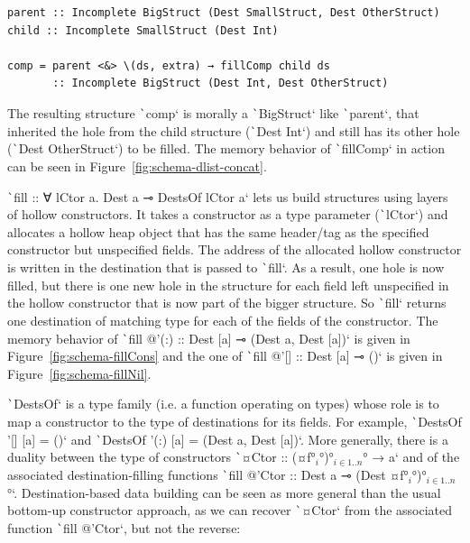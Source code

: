 \documentclass[english]{jflart}
\newlength{\currentparskip}
\newenvironment{unbreakable}
{%
  \setlength{\currentparskip}{\parskip}%
  \setlength{\parskip}{\currentparskip}%
  \par\vspace{0.5\baselineskip}%
  \noindent\begin{minipage}{\textwidth}%
    \setlength{\parskip}{\currentparskip}%
}
{%
  \end{minipage}%
  \par\vspace{0.5\baselineskip}%
}
\begin{document}
\begin{unbreakable}
{\small
\begin{verbatim}
parent :: Incomplete BigStruct (Dest SmallStruct, Dest OtherStruct)
child :: Incomplete SmallStruct (Dest Int)

comp = parent <&> \(ds, extra) → fillComp child ds
       :: Incomplete BigStruct (Dest Int, Dest OtherStruct)
\end{verbatim}
}
\end{unbreakable}

The resulting structure \texttt`comp` is morally a \texttt`BigStruct` like \texttt`parent`, that inherited the hole from the child structure (\texttt`Dest Int`) and still has its other hole (\texttt`Dest OtherStruct`) to be filled. The memory behavior of \texttt`fillComp` in action can be seen in Figure~\ref{fig:schema-dlist-concat}.

\texttt`fill :: ∀ lCtor a. Dest a ⊸ DestsOf lCtor a` lets us build structures using layers of hollow constructors. It takes a constructor as a type parameter (\texttt`lCtor`) and allocates a hollow heap object that has the same header/tag as the specified constructor but unspecified fields. The address of the allocated hollow constructor is written in the destination that is passed to \texttt`fill`. As a result, one hole is now filled, but there is one new hole in the structure for each field left unspecified in the hollow constructor that is now part of the bigger structure. So \texttt`fill` returns one destination of matching type for each of the fields of the constructor. The memory behavior of \texttt`fill @'(:) :: Dest [a] ⊸ (Dest a, Dest [a])` is given in Figure~\ref{fig:schema-fillCons} and the one of \texttt`fill @'[] :: Dest [a] ⊸ ()` is given in Figure~\ref{fig:schema-fillNil}.

\texttt`DestsOf` is a type family (i.e. a function operating on types) whose role is to map a constructor to the type of destinations for its fields. For example, \texttt`DestsOf '[] [a] = ()` and \texttt`DestsOf '(:) [a] = (Dest a, Dest [a])`. More generally, there is a duality between the type of constructors \texttt`¤Ctor :: (¤f°$_i$°)°$_{i \in 1..n}$° → a` and of the associated destination-filling functions \texttt`fill @'Ctor :: Dest a ⊸ (Dest ¤f°$_i$°)°$_{i \in 1..n}$°`. Destination-based data building can be seen as more general than the usual bottom-up constructor approach, as we can recover \texttt`¤Ctor` from the associated function \texttt`fill @'Ctor`, but not the reverse:
\end{document}
